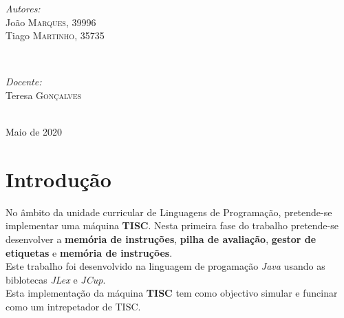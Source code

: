 \documentclass[a4paper,12pt,headings=small]{article}
\begin{document}
\begin{titlepage}
%
\begin{minipage}{0.4\textwidth}
\begin{flushleft} \large
\emph{Autores:}\\
João \textsc{Marques}, 39996\\
Tiago \textsc{Martinho}, 35735\\
\end{flushleft}
\end{minipage}
~
\begin{minipage}{0.4\textwidth}
\begin{flushright} \large
\emph{Docente:} \\
Teresa \textsc{Gonçalves} \\
\end{flushright}
\end{minipage}\\[2cm]


{\large Maio de 2020}\\[1cm]  

\vfill %

\end{titlepage}

\newpage
\thispagestyle{empty}
\renewcommand\contentsname{Índice}
\tableofcontents
\newpage

\printindex

\section{Introdução}
\FloatBarrier
No âmbito da unidade curricular de Linguagens de Programação, pretende-se implementar uma máquina \textbf{TISC}. Nesta primeira fase do trabalho pretende-se desenvolver a \textbf{memória de instruções}, \textbf{pilha de avaliação}, \textbf{gestor de etiquetas} e \textbf{memória de instruções}.\\
Este trabalho foi desenvolvido na linguagem de progamação \textit{Java} usando as biblotecas \textit{JLex} e \textit{JCup}.\\
Esta implementação da máquina \textbf{TISC} tem como objectivo simular e funcinar como um intrepetador de TISC.
\end{document}
